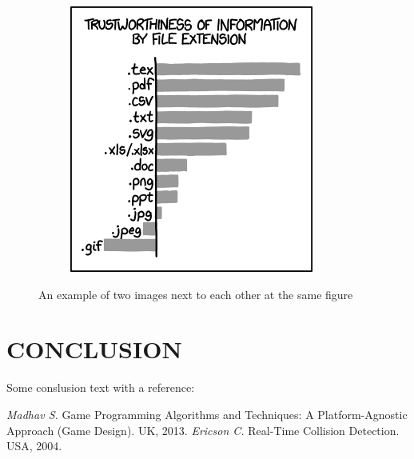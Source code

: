 \documentclass[intlimits,twoside,a4paper,11pt]{article}
\begin{document}
\begin{figure}[H]
\begin{subfigure}[t]{50mm}
            \includegraphics[width=\textwidth]{xkcd1301.png}
            \subcaption{} %
            \label{fig-example-2b}
        \end{subfigure}
        \caption{An example of two images next to each other at the same figure} \label{fig-example-2}
    \end{figure}

    \section{CONCLUSION}
    Some conslusion text with a reference:~\cite{lib-1,lib-2}

    \begin{thebibliography}{9}
         {\it Madhav S.} Game Programming Algorithms and Techniques: A Platform-Agnostic Approach (Game Design). UK, 2013.
         {\it Ericson C.} Real-Time Collision Detection. USA, 2004.
    \end{thebibliography}


\end{document}
